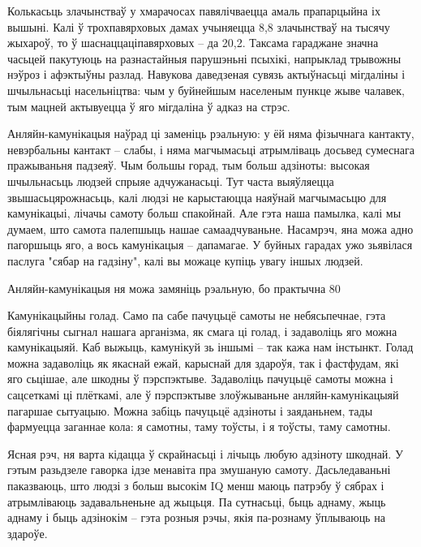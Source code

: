 Колькасьць злачынстваў у хмарачосах павялічваецца амаль прапарцыйна іх вышыні. Калі ў трохпавярховых дамах учыняецца 8,8 злачынстваў на тысячу жыхароў, то ў шаснаццаціпавярховых – да 20,2. Таксама гараджане значна часьцей пакутуюць на разнастайныя парушэньні псыхікі, напрыклад трывожны нэўроз і афэктыўны разлад. Навукова даведзеная сувязь актыўнасьці мігдаліны і шчыльнасьці насельніцтва: чым у буйнейшым населеным пункце жыве чалавек, тым мацней актывуецца ў яго мігдаліна ў адказ на стрэс.

Анляйн-камунікацыя наўрад ці заменіць рэальную: у ёй няма фізычнага кантакту, невэрбальны кантакт – слабы, і няма магчымасьці атрымліваць досьвед сумеснага пражываньня падзеяў. Чым большы горад, тым больш адзіноты: высокая шчыльнасьць людзей спрыяе адчужанасьці. Тут часта выяўляецца звышасьцярожнасьць, калі людзі не карыстаюцца наяўнай магчымасьцю для камунікацыі, лічачы самоту больш спакойнай. Але гэта наша памылка, калі мы думаем, што самота палепшыць нашае самаадчуваньне. Насамрэч, яна можа адно пагоршыць яго, а вось камунікацыя – дапамагае. У буйных гарадах ужо зьявілася паслуга "сябар на гадзіну", калі вы можаце купіць увагу іншых людзей.

Анляйн-камунікацыя ня можа замяніць рэальную, бо практычна 80%

Камунікацыйны голад. Само па сабе пачуцьцё самоты не небясьпечнае, гэта біялягічны сыгнал нашага арганізма, як смага ці голад, і задаволіць яго можна камунікацыяй. Каб выжыць, камунікуй зь іншымі – так кажа нам інстынкт. Голад можна задаволіць як якаснай ежай, карыснай для здароўя, так і фастфудам, які яго сьцішае, але шкодны ў пэрспэктыве. Задаволіць пачуцьцё самоты можна і сацсеткамі ці плёткамі, але ў пэрспэктыве злоўжываньне анляйн-камунікацыяй пагаршае сытуацыю. Можна забіць пачуцьцё адзіноты і заяданьнем, тады фармуецца заганнае кола: я самотны, таму тоўсты, і я тоўсты, таму самотны.

Ясная рэч, ня варта кідацца ў скрайнасьці і лічыць любую адзіноту шкоднай. У гэтым разьдзеле гаворка ідзе менавіта пра змушаную самоту. Дасьледаваньні паказваюць, што людзі з больш высокім IQ менш маюць патрэбу ў сябрах і атрымліваюць задавальненьне ад жыцьця. Па сутнасьці, быць аднаму, жыць аднаму і быць адзінокім – гэта розныя рэчы, якія па-рознаму ўплываюць на здароўе.


